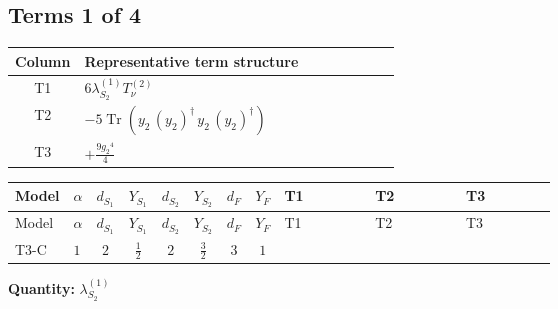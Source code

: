 \documentclass[8pt]{article}
\begin{document}
\begin{landscape}
\subsection*{Terms 1 of 4}
\begin{center}
\begin{tabular}{@{}c >{\raggedright\arraybackslash}p{0.82\linewidth}@{}}
\toprule
Column & Representative term structure \\
\midrule
T1 & \(\displaystyle 6 {\lambda_{S_2}^{(1)}} T_{\nu}^{(2)}\) \\
\midrule
T2 & \(\displaystyle -5 \operatorname{Tr}\!\left({y_2}\,\left({y_2}\right)^{\dagger}\,{y_2}\,\left({y_2}\right)^{\dagger}\right)\) \\
\midrule
T3 & \(\displaystyle +\frac{9 {g_2}^4}{4}\) \\
\midrule
\bottomrule
\end{tabular}
\end{center}
\smallskip
\tiny
\begin{longtable}{@{}llcccccc >{\raggedright\arraybackslash}p{0.21\linewidth} >{\raggedright\arraybackslash}p{0.21\linewidth} >{\raggedright\arraybackslash}p{0.21\linewidth}@{}}
\toprule
Model & $\alpha$ & $d_{S_1}$ & $Y_{S_1}$ & $d_{S_2}$ & $Y_{S_2}$ & $d_F$ & $Y_F$ & T1 & T2 & T3 \\
\midrule
\endfirsthead
\toprule
Model & $\alpha$ & $d_{S_1}$ & $Y_{S_1}$ & $d_{S_2}$ & $Y_{S_2}$ & $d_F$ & $Y_F$ & T1 & T2 & T3 \\
\midrule
\endhead
T3-C & $1$ & $2$ & $\frac{1}{2}$ & $2$ & $\frac{3}{2}$ & $3$ & $1$ & \scriptsize\adjustbox{max width=\linewidth}{$\begin{gathered} 6 {\lambda_{S_2}^{(1)}} T_{\nu}^{(2)}\end{gathered}$} & \scriptsize\adjustbox{max width=\linewidth}{$\begin{gathered} -5 \operatorname{Tr}\!\left({y_2}\,\left({y_2}\right)^{\dagger}\,{y_2}\,\left({y_2}\right)^{\dagger}\right)\end{gathered}$} & \scriptsize\adjustbox{max width=\linewidth}{$\begin{gathered} +\frac{9 {g_2}^4}{4}\end{gathered}$} \\
\midrule
\bottomrule
\end{longtable}
\clearpage
\noindent\textbf{Quantity: }$\lambda_{S_2}^{(1)}$\par\smallskip

\end{landscape}
\end{document}
